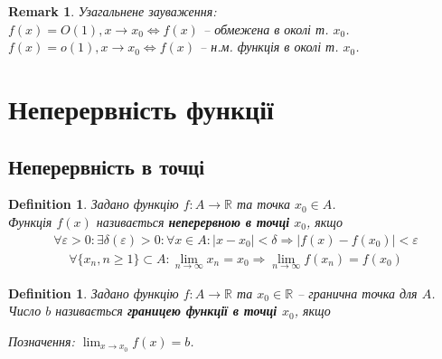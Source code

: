 \documentclass[a4paper, 14pt]{article}
\theoremstyle{theoremdd}
\theoremstyle{theoremdd}
\newtheorem{definition}[theorem]{Definition}
\theoremstyle{theoremdd}
\theoremstyle{theoremdd}
\theoremstyle{theoremdd}
\theoremstyle{theoremdd}
\newtheorem{remark}[theorem]{Remark}
\theoremstyle{theoremdd}
\theoremstyle{theoremdd}
\begin{document}
\begin{remark}
Узагальнене зауваження:\\
$f(x) = O(1), x \to x_0 \iff f(x)$ -- обмежена в околі т. $x_0$.\\
$f(x) = o(1), x \to x_0 \iff f(x)$ -- н.м. функція в околі т. $x_0$.
\\ %
\end{remark}
\newpage

\section{Неперервність функції}
\subsection{Неперервність в точці}
\begin{definition}
Задано функцію $f \colon A \to \mathbb{R}$ та точка $x_0 \in A$.\\
Функція $f(x)$ називається \textbf{неперервною в точці} $x_0$, якщо
	\begin{align*}
	\forall \varepsilon > 0: \exists \delta(\varepsilon) > 0: \forall x \in A: |x-x_0|<\delta \Rightarrow |f(x)-f(x_0)|<\varepsilon \tag*{означення Коші}
	\end{align*}
	\begin{align*}
	\forall \{x_n, n \geq 1\}\subset A: \lim_{n \to \infty} x_n = x_0 \Rightarrow \lim_{n \to \infty} f(x_n) = f(x_0) \tag*{означення Гайне}
	\end{align*}
\end{definition}

	\begin{definition}
	Задано функцію $f \colon A \to \mathbb{R}$ та $x_0 \in \mathbb{R}$ -- гранична точка для $A$.\\
	Число $b$ називається \textbf{границею функції в точці $x_0$}, якщо

	Позначення: $\displaystyle \lim_{x \to x_0} f(x) = b$.
	\end{definition}
\end{document}
